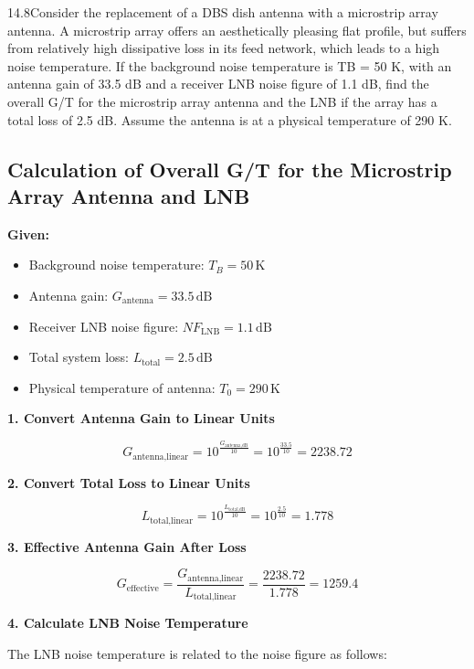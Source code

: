 \documentclass[cn,12pt]{homework}
\begin{document}
14.8Consider the replacement of a DBS dish antenna with a microstrip array antenna. A microstrip array
offers an aesthetically pleasing flat profile, but suffers from relatively high dissipative loss in its feed
network, which leads to a high noise temperature. If the background noise temperature is TB = 50 K,
with an antenna gain of 33.5 dB and a receiver LNB noise figure of 1.1 dB, find the overall G/T for
the microstrip array antenna and the LNB if the array has a total loss of 2.5 dB. Assume the antenna
is at a physical temperature of 290 K.



\begin{solution}
  \section*{Calculation of Overall G/T for the Microstrip Array Antenna and LNB}

\textbf{Given:}
\begin{itemize}
    \item Background noise temperature: \( T_B = 50 \, \text{K} \)
    \item Antenna gain: \( G_{\text{antenna}} = 33.5 \, \text{dB} \)
    \item Receiver LNB noise figure: \( NF_{\text{LNB}} = 1.1 \, \text{dB} \)
    \item Total system loss: \( L_{\text{total}} = 2.5 \, \text{dB} \)
    \item Physical temperature of antenna: \( T_0 = 290 \, \text{K} \)
\end{itemize}

\textbf{1. Convert Antenna Gain to Linear Units}

\[
G_{\text{antenna,linear}} = 10^{\frac{G_{\text{antenna,dB}}}{10}} = 10^{\frac{33.5}{10}} = 2238.72
\]

\textbf{2. Convert Total Loss to Linear Units}

\[
L_{\text{total,linear}} = 10^{\frac{L_{\text{total,dB}}}{10}} = 10^{\frac{2.5}{10}} = 1.778
\]

\textbf{3. Effective Antenna Gain After Loss}

\[
G_{\text{effective}} = \frac{G_{\text{antenna,linear}}}{L_{\text{total,linear}}} = \frac{2238.72}{1.778} = 1259.4
\]

\textbf{4. Calculate LNB Noise Temperature}

The LNB noise temperature is related to the noise figure as follows:


\end{solution}
\end{document}
